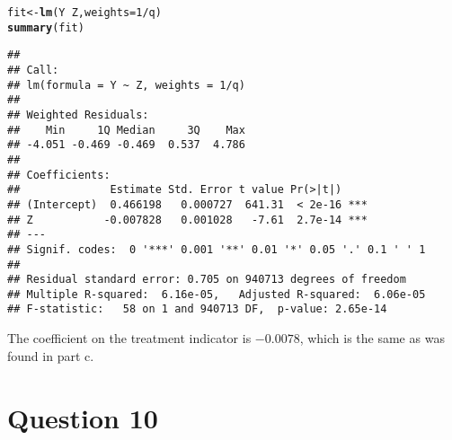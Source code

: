 \documentclass[11pt,notitlepage]{article}\usepackage[]{graphicx}\usepackage[]{color}
\makeatletter
\newcommand{\hlnum}[1]{\textcolor[rgb]{0.686,0.059,0.569}{#1}}%
\newcommand{\hlopt}[1]{\textcolor[rgb]{0,0,0}{#1}}%
\newcommand{\hlstd}[1]{\textcolor[rgb]{0.345,0.345,0.345}{#1}}%
\newcommand{\hlkwb}[1]{\textcolor[rgb]{0.69,0.353,0.396}{#1}}%
\newcommand{\hlkwc}[1]{\textcolor[rgb]{0.333,0.667,0.333}{#1}}%
\newcommand{\hlkwd}[1]{\textcolor[rgb]{0.737,0.353,0.396}{\textbf{#1}}}%
\newenvironment{kframe}{%
 \def\at@end@of@kframe{}%
 \ifinner\ifhmode%
  \def\at@end@of@kframe{\end{minipage}}%
  \begin{minipage}{\columnwidth}%
 \fi\fi%
 \def\FrameCommand##1{\hskip\@totalleftmargin \hskip-\fboxsep
 \colorbox{shadecolor}{##1}\hskip-\fboxsep
     \hskip-\linewidth \hskip-\@totalleftmargin \hskip\columnwidth}%
 \MakeFramed {\advance\hsize-\width
   \@totalleftmargin\z@ \linewidth\hsize
   \@setminipage}}%
 {\par\unskip\endMakeFramed%
 \at@end@of@kframe}
\newenvironment{knitrout}{}{} %
\makeatother
\begin{document}
\begin{enumerate}[a)]
\begin{knitrout}
\begin{kframe}
\begin{alltt}
\hlstd{fit} \hlkwb{<-} \hlkwd{lm}\hlstd{(Y} \hlopt{~} \hlstd{Z,} \hlkwc{weights}\hlstd{=}\hlnum{1}\hlopt{/}\hlstd{q)}
\hlkwd{summary}\hlstd{(fit)}
\end{alltt}
\begin{verbatim}
## 
## Call:
## lm(formula = Y ~ Z, weights = 1/q)
## 
## Weighted Residuals:
##    Min     1Q Median     3Q    Max 
## -4.051 -0.469 -0.469  0.537  4.786 
## 
## Coefficients:
##              Estimate Std. Error t value Pr(>|t|)    
## (Intercept)  0.466198   0.000727  641.31  < 2e-16 ***
## Z           -0.007828   0.001028   -7.61  2.7e-14 ***
## ---
## Signif. codes:  0 '***' 0.001 '**' 0.01 '*' 0.05 '.' 0.1 ' ' 1
## 
## Residual standard error: 0.705 on 940713 degrees of freedom
## Multiple R-squared:  6.16e-05,	Adjusted R-squared:  6.06e-05 
## F-statistic:   58 on 1 and 940713 DF,  p-value: 2.65e-14
\end{verbatim}
\end{kframe}
\end{knitrout}

The coefficient on the treatment indicator is \ensuremath{-0.0078}, which is the same as was found in part c.

\end{enumerate}


\section*{Question 10}

\begin{knitrout}
\color{fgcolor}\begin{kframe}
\begin{verbatim}





\end{verbatim}
\end{kframe}
\end{knitrout}
\end{document}
